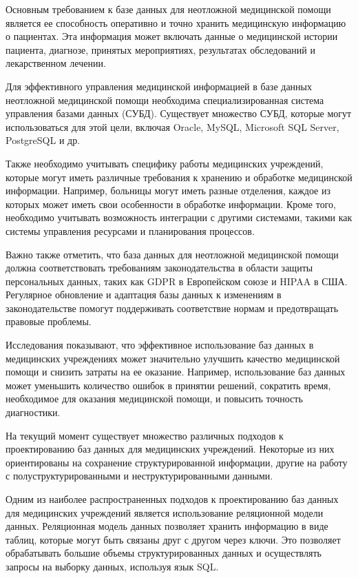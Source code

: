 Основным требованием к базе данных для неотложной медицинской помощи является ее способность оперативно и точно хранить медицинскую информацию о пациентах. Эта информация может включать данные о медицинской истории пациента, диагнозе, принятых мероприятиях, результатах обследований и лекарственном лечении.

Для эффективного управления медицинской информацией в базе данных неотложной медицинской помощи необходима специализированная система управления базами данных (СУБД). Существует множество СУБД, которые могут использоваться для этой цели, включая Oracle, MySQL, Microsoft SQL Server, PostgreSQL и др.

Также необходимо учитывать специфику работы медицинских учреждений, которые могут иметь различные требования к хранению и обработке медицинской информации. Например, больницы могут иметь разные отделения, каждое из которых может иметь свои особенности в обработке информации. Кроме того, необходимо учитывать возможность интеграции с другими системами, такими как системы управления ресурсами и планирования процессов.

Важно также отметить, что база данных для неотложной медицинской помощи должна соответствовать требованиям законодательства в области защиты персональных данных, таких как GDPR в Европейском союзе и HIPAA в США. Регулярное обновление и адаптация базы данных к изменениям в законодательстве помогут поддерживать соответствие нормам и предотвращать правовые проблемы.

Исследования показывают, что эффективное использование баз данных в медицинских учреждениях может значительно улучшить качество медицинской помощи и снизить затраты на ее оказание. Например, использование баз данных может уменьшить количество ошибок в принятии решений, сократить время, необходимое для оказания медицинской помощи, и повысить точность диагностики.

На текущий момент существует множество различных подходов к проектированию баз данных для медицинских учреждений. Некоторые из них ориентированы на сохранение структурированной информации, другие на работу с полуструктурированными и неструктурированными данными.

Одним из наиболее распространенных подходов к проектированию баз данных для медицинских учреждений является использование реляционной модели данных. Реляционная модель данных позволяет хранить информацию в виде таблиц, которые могут быть связаны друг с другом через ключи. Это позволяет обрабатывать большие объемы структурированных данных и осуществлять запросы на выборку данных, используя язык SQL.

